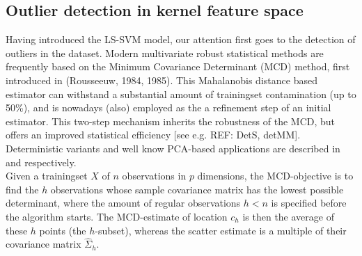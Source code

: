 \documentclass[preprint,12pt]{elsarticle}
\begin{document}
%	
	
	\subsection{Outlier detection in kernel feature space}
	
	Having introduced the LS-SVM model, our attention first goes to the detection of outliers in the dataset. Modern multivariate robust statistical methods are frequently based on the Minimum Covariance Determinant (MCD) method, first introduced in  (Rousseeuw, 1984, 1985). This Mahalanobis distance based estimator can withstand a substantial amount of trainingset contamination (up to 50\%), and is nowadays (also) employed as the a refinement step of an initial estimator. This two-step mechanism inherits the robustness of the MCD, but offers an improved statistical efficiency [see e.g. REF: DetS, detMM]. Deterministic variants and well know PCA-based applications are described in \cite{hubert2012deterministic} and \cite{hubert2005robpca} respectively. \\
	
	Given a trainingset $X$ of $n$ observations in $p$ dimensions, the MCD-objective is to find the $h$ observations whose sample covariance matrix has the lowest possible determinant, where the amount of regular observations $h < n$ is specified before the algorithm starts. The MCD-estimate of location $c_h$ is then the average of these $h$ points (the $h$-subset), whereas the scatter estimate is a multiple of their covariance matrix $\hat{\Sigma}_{h}$. 
	
\end{document}
